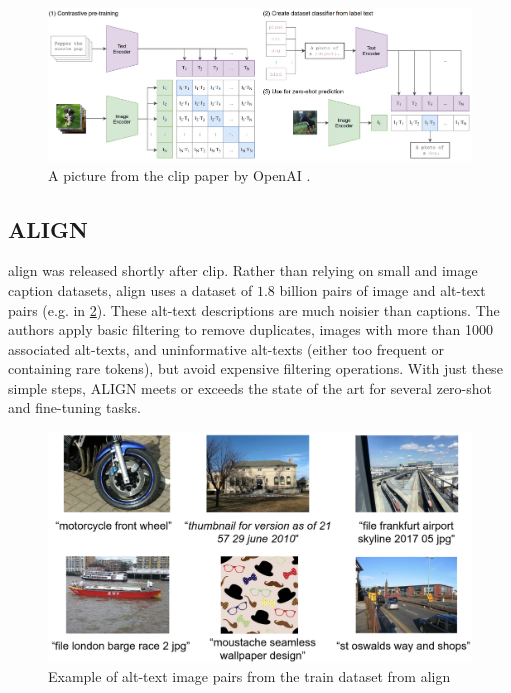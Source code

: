         \begin{figure}[!h]
            \centering
            \includegraphics[width=\textwidth]{Images/crossmodalnetworks/OpenAICLIP.png}
            \caption{A picture from the \acrshort{clip} paper by OpenAI \cite{clip}.}
            \label{fig:crossmodalnetworks:openaiclip}
        \end{figure}

        \subsection{ALIGN
            \label{section:align}}
        \acrfull{align}\cite{ALIGN} was released shortly after \acrshort{clip}.
        Rather than relying on small and image caption datasets, \acrshort{align} uses a dataset of \(1.8\) billion pairs of image and alt-text pairs (e.g. in \cref{fig:crossmodalnetworks:alignepairs}).
        These alt-text descriptions are much noisier than captions.
        The authors apply basic filtering to remove duplicates, images with more than 1000 associated alt-texts, and uninformative alt-texts (either too frequent or containing rare tokens), but avoid expensive filtering operations.
        With just these simple steps, ALIGN meets or exceeds the state of the art for several zero-shot and fine-tuning tasks.
        \begin{figure}
            \centering
            \includegraphics[width=\textwidth]{Images/crossmodalnetworks/examplepicsalign.png}
            \caption{Example of alt-text image pairs from the train dataset from \acrshort{align}}
            \label{fig:crossmodalnetworks:alignepairs}
        \end{figure}

